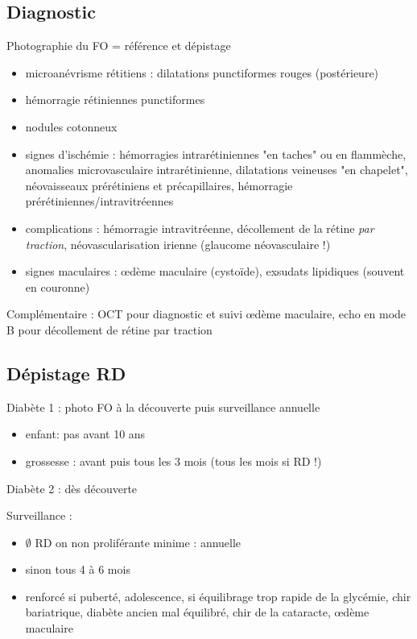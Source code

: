 \documentclass[11pt]{article}
\begin{document}
\subsection{Diagnostic}
\label{sec:orgf0dd39e}
Photographie du FO = référence et dépistage
\begin{itemize}
\item microanévrisme rétitiens : dilatations punctiformes rouges (postérieure)
\item hémorragie rétiniennes punctiformes
\item nodules cotonneux
\item signes d'ischémie : hémorragies intrarétiniennes "en taches" ou en flammèche, anomalies
microvasculaire intrarétinienne, dilatations veineuses "en chapelet",
néovaisseaux prérétiniens et précapillaires, hémorragie prérétiniennes/intravitréennes
\item complications : hémorragie intravitréenne, décollement de la rétine \emph{par
traction}, néovascularisation irienne (\thus glaucome néovasculaire !)
\item signes maculaires : \oe{}dème maculaire (cystoïde), exsudats lipidiques
(souvent en couronne)
\end{itemize}

Complémentaire : OCT pour diagnostic et suivi \oe{}dème maculaire, echo en mode B
pour décollement de rétine par traction

\subsection{Dépistage RD}
\label{sec:orgf1b9b14}
Diabète 1 : photo FO à la découverte puis surveillance annuelle
\begin{itemize}
\item enfant: pas avant 10 ans
\item grossesse : avant puis tous les 3 mois (tous les mois si RD !)
\end{itemize}
Diabète 2 : dès découverte

Surveillance :
\begin{itemize}
\item \(\emptyset\) RD on non proliférante minime : annuelle
\item sinon tous 4 à 6 mois
\item renforcé si puberté, adolescence, si équilibrage trop rapide de la glycémie,
chir bariatrique, diabète ancien mal équilibré, chir de la cataracte,
\oe{}dème maculaire
\end{itemize}
\end{document}
